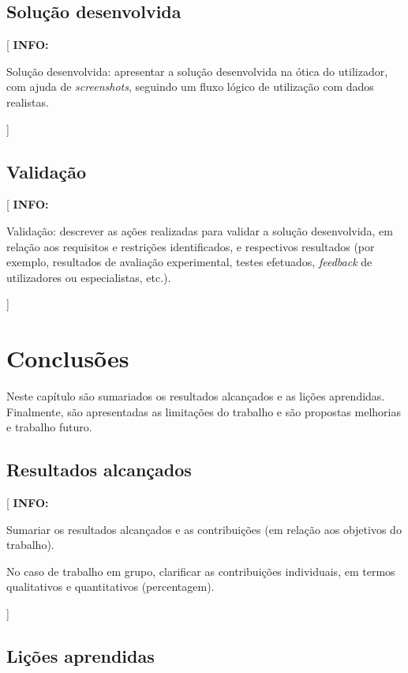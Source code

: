 \documentclass[11pt,a4paper]{report}
\newenvironment{info}[1]{\vspace*{6mm}\color{blue}[ \textbf{INFO:} \begin{em} #1}
                        {\vspace*{3mm}\end{em} ]}
\begin{document}
\section{Solução desenvolvida}

\begin{info}
Solução desenvolvida: apresentar a solução desenvolvida na ótica do
utilizador, com ajuda de \emph{screenshots}, seguindo um fluxo lógico
de utilização com dados realistas.
\end{info}

\section{Validação}

\begin{info}
Validação: descrever as ações realizadas para validar a solução
desenvolvida, em relação aos requisitos e restrições identificados, e 
respectivos resultados (por exemplo, resultados de avaliação
experimental, testes efetuados, \emph{feedback} de utilizadores ou
especialistas, etc.). 
\end{info}


\chapter{Conclusões}

Neste capítulo são sumariados os resultados alcançados e as lições
aprendidas.
Finalmente, são apresentadas as limitações do trabalho e são propostas
melhorias e trabalho futuro. 

\section{Resultados alcançados}

\begin{info}
Sumariar os resultados alcançados e as contribuições (em
relação aos objetivos do trabalho).

No caso de trabalho em grupo, clarificar as contribuições individuais,
em termos qualitativos e quantitativos (percentagem). 
\end{info}

\lipsum[11]

\section{Lições aprendidas}
\end{document}

